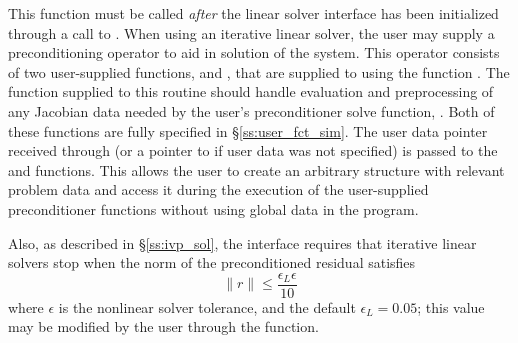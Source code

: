 {{  This function must be called \emph{after} the {\idals} linear solver interface
  has been initialized through a call to .
}
When using an iterative linear solver, the user may supply a
preconditioning operator to aid in solution of the system.  This
operator consists of two user-supplied functions,  and
, that are supplied to {\ida} using the function
.  The  function supplied to
this routine should handle evaluation and preprocessing of any
Jacobian data needed by the user's preconditioner solve function,
.  Both of these functions are fully specified in
\S\ref{ss:user_fct_sim}.  The user data pointer received through
 (or a pointer to  if user data was not
specified) is passed to the  and  functions.
This allows the user to create an arbitrary structure with relevant
problem data and access it during the execution of the user-supplied
preconditioner functions without using global data in the program.

Also, as described in \S\ref{ss:ivp_sol}, the {\idals} interface
requires that iterative linear solvers stop when the norm of the
preconditioned residual satisfies
\[
  \|r\| \le \frac{\epsilon_L \epsilon}{10}
\]
where $\epsilon$ is the nonlinear solver tolerance, and the default
$\epsilon_L = 0.05$; this value may be modified by the user through
the  function.


}
